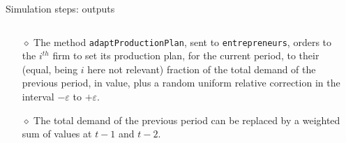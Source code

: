 \documentclass[9pt]{beamer}
\begin{document}
\begin{frame}[fragile]{Simulation steps: outputs}

\begin{columns}[T]
\begin{column}{.7\textwidth}
\begin{block}{}

\begin{itemize}

\item[$\diamond$] The method \verb|adaptProductionPlan|, sent to \verb"entrepreneurs", orders to the $i^{th}$ firm to set its production plan, for the current period, to their (equal, being $i$ here not relevant) fraction of the total demand of the previous period, in value, plus a random uniform relative correction in the interval $-\varepsilon$ to $+\varepsilon$.

\item[$\diamond$] The total demand of the previous period can be replaced by a weighted sum of values at $t-1$ and $t-2$.

\end{itemize}
     
\end{block}
\end{column}

 \begin{column}{.3\textwidth}
\vspace{-6\baselineskip}
 \begin{block}{}
 
  \end{block}
  \end{column}
 
\end{columns}

\end{frame}
\end{document}
